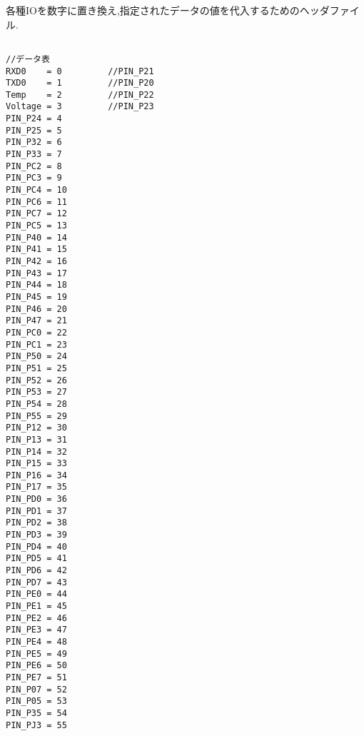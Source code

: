 \documentclass[12pt,oneside]{paper}
\begin{document}
各種IOを数字に置き換え,指定されたデータの値を代入するためのヘッダファイル.
\begin{lstlisting}[caption=ヘッダファイル　data.h,label=heda]

//データ表
RXD0    = 0 		//PIN_P21
TXD0    = 1 		//PIN_P20
Temp    = 2 		//PIN_P22
Voltage = 3 		//PIN_P23
PIN_P24 = 4		
PIN_P25 = 5 		
PIN_P32 = 6 		
PIN_P33 = 7		
PIN_PC2 = 8		
PIN_PC3 = 9		
PIN_PC4 = 10		
PIN_PC6 = 11		
PIN_PC7 = 12		
PIN_PC5 = 13		
PIN_P40 = 14		
PIN_P41 = 15		
PIN_P42 = 16		
PIN_P43 = 17		
PIN_P44 = 18		
PIN_P45 = 19		
PIN_P46 = 20		
PIN_P47 = 21		
PIN_PC0 = 22		
PIN_PC1 = 23		
PIN_P50 = 24		
PIN_P51 = 25		
PIN_P52 = 26		
PIN_P53 = 27		
PIN_P54 = 28		
PIN_P55 = 29		
PIN_P12 = 30		
PIN_P13 = 31		
PIN_P14 = 32		
PIN_P15 = 33		
PIN_P16 = 34		
PIN_P17 = 35		
PIN_PD0 = 36		
PIN_PD1 = 37		
PIN_PD2 = 38		
PIN_PD3 = 39		
PIN_PD4 = 40		
PIN_PD5 = 41		
PIN_PD6 = 42		
PIN_PD7 = 43		
PIN_PE0 = 44		
PIN_PE1 = 45		
PIN_PE2 = 46		
PIN_PE3 = 47		
PIN_PE4 = 48		
PIN_PE5 = 49		
PIN_PE6 = 50		
PIN_PE7 = 51		
PIN_P07 = 52		
PIN_P05 = 53		
PIN_P35 = 54		
PIN_PJ3 = 55		




\end{lstlisting}
\end{document}
